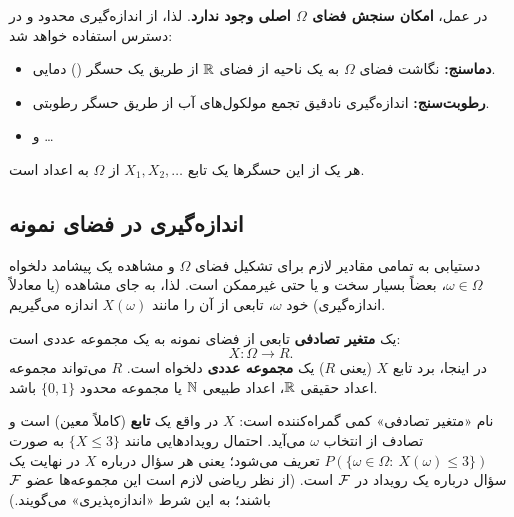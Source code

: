 در عمل، \textbf{امکان سنجش فضای $\Omega$ اصلی وجود ندارد}. لذا، از اندازه‌گیری محدود و در دسترس استفاده خواهد شد:
\begin{itemize}
\item \textbf{دماسنج:} نگاشت فضای $\Omega$ به یک ناحیه از فضای $\mathbb{R}$ از طریق یک حسگر () دمایی.
\item \textbf{رطوبت‌سنج:} اندازه‌گیری نادقیق تجمع مولکول‌های آب از طریق حسگر رطوبتی.
\item و \ldots
\end{itemize}
هر یک از این حسگرها یک تابع $X_1,X_2,\ldots$ از $\Omega$ به اعداد است.

\begin{center}
\end{center}

\subsection{اندازه‌گیری در فضای نمونه}
دستیابی به تمامی مقادیر لازم برای تشکیل فضای $\Omega$ و مشاهده یک پیشامد دلخواه $\omega\in\Omega$، بعضاً بسیار سخت و یا حتی غیرممکن است. لذا، به جای مشاهده (یا معادلاً اندازه‌گیری) خود $\omega$، تابعی از آن را مانند $X(\omega)$ اندازه می‌گیریم.

\begin{definition}
یک \textbf{متغیر تصادفی} تابعی از فضای نمونه به یک مجموعه عددی است:
\[X:\Omega\to R .\]
در اینجا، برد تابع $X$ (یعنی $R$) یک \textbf{مجموعه عددی} دلخواه است. $R$ می‌تواند مجموعه اعداد حقیقی $\mathbb{R}$، اعداد طبیعی $\mathbb{N}$ یا مجموعه محدود $\{0,1\}$ باشد.
\end{definition}

\begin{note}
\notetitle نام «متغیر تصادفی» کمی گمراه‌کننده است: $X$ در واقع یک \textbf{تابع} (کاملاً معین) است و تصادف از انتخاب $\omega$ می‌آید. احتمال رویدادهایی مانند $\{X\le 3\}$ به صورت $P(\{\omega\in\Omega:\ X(\omega)\le3\})$ تعریف می‌شود؛ یعنی هر سؤال درباره $X$ در نهایت یک سؤال درباره یک رویداد در $\mathcal{F}$ است. (از نظر ریاضی لازم است این مجموعه‌ها عضو $\mathcal{F}$ باشند؛ به این شرط «اندازه‌پذیری» می‌گویند.)
\end{note}

